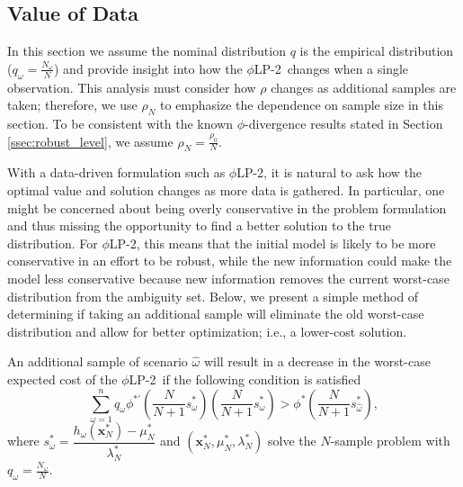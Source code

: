 \documentclass[opre,nonblindrev]{informs3} %
\newcommand{\x}{\mathbf{x}}
\newcommand{\plp}{$\phi$LP-2}
\begin{document}
\subsection{Value of Data}
\label{ssec:value}

In this section we assume the nominal distribution $q$ is the empirical distribution ($q_\omega = \tfrac{N_\omega}{N}$) and provide insight into how the \plp\ changes when a single observation.
This analysis must consider how $\rho$ changes as additional samples are taken; therefore, we use $\rho_N$ to emphasize the dependence on sample size in this section.
To be consistent with the known $\phi$-divergence results stated in Section \ref{ssec:robust_level}, we assume $\rho_N = \frac{\rho_0}{N}$.

With a data-driven formulation such as \plp, it is natural to ask how the optimal value and solution changes as more data is gathered.
In particular, one might be concerned about being overly conservative in the problem formulation and thus missing the opportunity to find a better solution to the true distribution.
For \plp, this means that the initial model is likely to be more conservative in an effort to be robust, while the new information could make the model less conservative because new information removes the current worst-case distribution from the ambiguity set.  
Below, we present a simple method of determining if taking an additional sample will eliminate the old worst-case distribution and allow for better optimization; i.e., a lower-cost solution.

\begin{theorem}
	\label{thm:value}
	An additional sample of scenario $\hat{\omega}$ will result in a decrease in the worst-case expected cost of the \plp\ if the following condition is satisfied
	\begin{equation} \label{eq:cost_decrease_cond}
		\sum_{\omega=1}^n q_\omega \phi^{*\prime}\left(\frac{N}{N+1}s^*_\omega\right) \left(\frac{N}{N+1}s^*_\omega\right) > \phi^*\left(\frac{N}{N+1}s^*_{\hat{\omega}}\right),
	\end{equation}
	where $s^*_\omega = \dfrac{h_\omega(\x^*_N) - \mu^*_N}{\lambda^*_N}$ and $(\x^*_N,\mu^*_N,\lambda^*_N)$ solve the $N$-sample problem with $q_\omega = \tfrac{N_\omega}{N}$.
\end{theorem}
\end{document}
